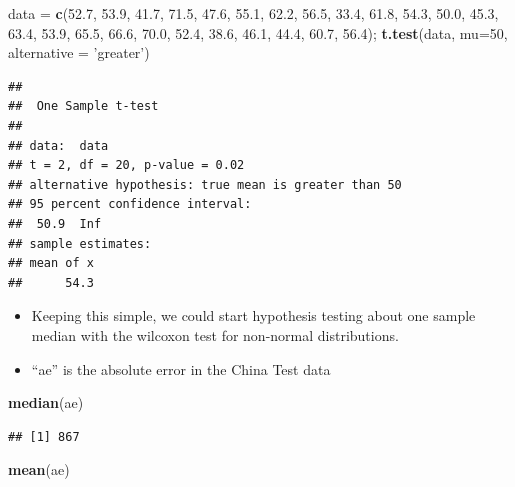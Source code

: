 \documentclass[]{book}
\newenvironment{Shaded}{\begin{snugshade}}{\end{snugshade}}
\newcommand{\KeywordTok}[1]{\textcolor[rgb]{0.13,0.29,0.53}{\textbf{{#1}}}}
\newcommand{\DataTypeTok}[1]{\textcolor[rgb]{0.13,0.29,0.53}{{#1}}}
\newcommand{\DecValTok}[1]{\textcolor[rgb]{0.00,0.00,0.81}{{#1}}}
\newcommand{\FloatTok}[1]{\textcolor[rgb]{0.00,0.00,0.81}{{#1}}}
\newcommand{\StringTok}[1]{\textcolor[rgb]{0.31,0.60,0.02}{{#1}}}
\newcommand{\NormalTok}[1]{{#1}}
\begin{document}
\begin{Shaded}
\begin{Highlighting}[]
\NormalTok{data =}\StringTok{ }\KeywordTok{c}\NormalTok{(}\FloatTok{52.7}\NormalTok{, }\FloatTok{53.9}\NormalTok{, }\FloatTok{41.7}\NormalTok{, }\FloatTok{71.5}\NormalTok{, }\FloatTok{47.6}\NormalTok{, }\FloatTok{55.1}\NormalTok{, }\FloatTok{62.2}\NormalTok{, }\FloatTok{56.5}\NormalTok{, }\FloatTok{33.4}\NormalTok{, }\FloatTok{61.8}\NormalTok{, }\FloatTok{54.3}\NormalTok{, }\FloatTok{50.0}\NormalTok{, }\FloatTok{45.3}\NormalTok{, }\FloatTok{63.4}\NormalTok{, }\FloatTok{53.9}\NormalTok{, }\FloatTok{65.5}\NormalTok{, }\FloatTok{66.6}\NormalTok{, }\FloatTok{70.0}\NormalTok{, }\FloatTok{52.4}\NormalTok{, }\FloatTok{38.6}\NormalTok{, }\FloatTok{46.1}\NormalTok{, }\FloatTok{44.4}\NormalTok{, }\FloatTok{60.7}\NormalTok{, }\FloatTok{56.4}\NormalTok{);}
\KeywordTok{t.test}\NormalTok{(data, }\DataTypeTok{mu=}\DecValTok{50}\NormalTok{, }\DataTypeTok{alternative =} \StringTok{'greater'}\NormalTok{)}
\end{Highlighting}
\end{Shaded}

\begin{verbatim}
## 
##  One Sample t-test
## 
## data:  data
## t = 2, df = 20, p-value = 0.02
## alternative hypothesis: true mean is greater than 50
## 95 percent confidence interval:
##  50.9  Inf
## sample estimates:
## mean of x 
##      54.3
\end{verbatim}

\begin{itemize}
\item
  Keeping this simple, we could start hypothesis testing about one
  sample median with the wilcoxon test for non-normal distributions.
\item
  ``ae'' is the absolute error in the China Test data
\end{itemize}

\begin{Shaded}
\begin{Highlighting}[]
\KeywordTok{median}\NormalTok{(ae)}
\end{Highlighting}
\end{Shaded}

\begin{verbatim}
## [1] 867
\end{verbatim}

\begin{Shaded}
\begin{Highlighting}[]
\KeywordTok{mean}\NormalTok{(ae)}
\end{Highlighting}
\end{Shaded}
\end{document}
